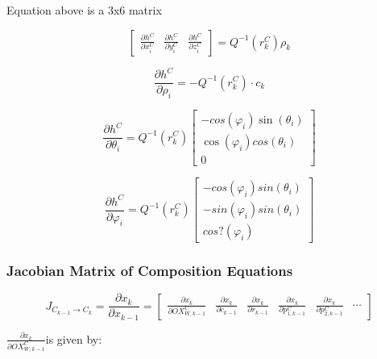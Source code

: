 Equation above is a 3x6 matrix

\begin{equation}
\begin{bmatrix}
\frac{\partial h^{C}}{\partial x_{i}^{C}} & 
\frac{\partial h^{C}}{\partial y_{i}^{C}} & 
\frac{\partial h^{C}}{\partial z_{i}^{C}}
\end{bmatrix}
 =Q^{-1}(r_{k}^{C})\rho _{k}
\end{equation}


\begin{equation}
\frac{\partial h^{C}}{\partial \rho _{i}}=-Q^{-1}(r_{k}^{C})\cdot c_{k}
\end{equation}


\begin{equation}
\frac{\partial h^{C}}{\partial \theta _{i}}=
Q^{-1}(r_{k}^{C}) \begin{bmatrix}
-cos(\varphi _{i})\sin(\theta _{i}) \\
\cos (\varphi _{i})cos(\theta _{i}) \\
0 \end{bmatrix}
\end{equation}

\begin{equation}
\frac{\partial h^{C}}{\partial \varphi _{i}}= 
Q^{-1}(r_{k}^{C}) \begin{bmatrix}
-cos(\varphi _{i})sin(\theta _{i}) \\
-sin(\varphi _{i})sin(\theta _{i}) \\
cos?(\varphi _{i})
\end{bmatrix}
\end{equation}

\subsubsection{Jacobian Matrix of Composition Equations}

\begin{equation}
J_{C_{k-1}\to C_{k}}=\frac{\partial x_{k}}{\partial x_{k-1}}=\begin{bmatrix}
\frac{\partial x_{k}}{\partial OX_{W, k-1}^{C}} &
\frac{\partial x_{k}}{\partial c_{k-1}} & 
\frac{\partial x_{k}}{\partial r_{k-1}} & 
\frac{\partial x_{k}}{\partial p_{1, k-1}^{C}} &
\frac{\partial x_{k}}{\partial p_{2, k-1}^{C}} &
\cdots 
\end{bmatrix}
\end{equation}

$\frac{\partial x_{k}}{\partial OX_{W, k-1}^{C}}$is given by:

